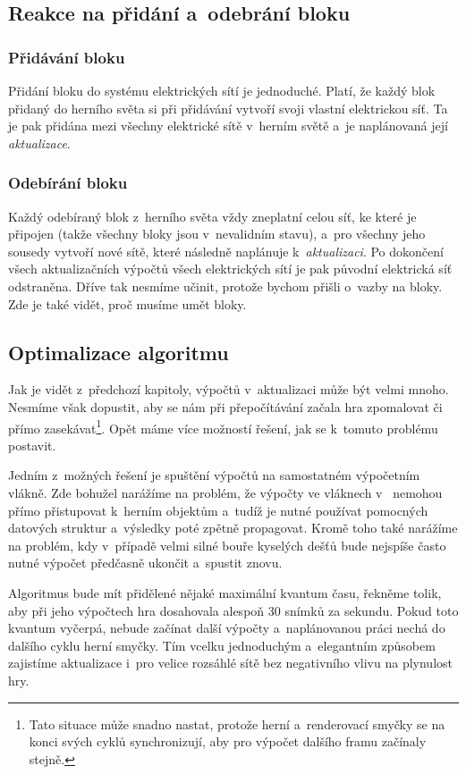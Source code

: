 \subsection{Reakce na přidání a~odebrání bloku}
\label{subsec:reac}
\subsubsection{Přidávání bloku}
Přidání bloku do systému elektrických sítí je jednoduché. Platí, že každý blok přidaný do herního světa si při přidávání vytvoří svoji vlastní elektrickou síť. Ta je pak přidána mezi všechny elektrické sítě v~herním světě a~je naplánovaná její \textit{aktualizace}. 

\subsubsection{Odebírání bloku}
Každý odebíraný blok z~herního světa vždy zneplatní celou síť, ke které je připojen (takže všechny bloky jsou v~nevalidním stavu), a~pro všechny jeho sousedy vytvoří nové sítě, které následně naplánuje k~\textit{aktualizaci}. Po dokončení všech aktualizačních výpočtů všech elektrických sítí je pak původní elektrická síť odstraněna. Dříve tak nesmíme učinit, protože bychom přišli o~vazby na bloky. Zde je také vidět, proč musíme umět  bloky.

\subsection{Optimalizace algoritmu}

Jak je vidět z~předchozí kapitoly, výpočtů v~aktualizaci může být velmi mnoho. Nesmíme však dopustit, aby se nám při přepočítávání začala hra zpomalovat či přímo zasekávat\footnote{Tato situace může snadno nastat, protože herní a~renderovací smyčky se na konci svých cyklů synchronizují, aby pro výpočet dalšího framu začínaly stejně.}. Opět máme více možností řešení, jak se k~tomuto problému postavit. 

Jedním z~možných řešení je spuštění výpočtů na samostatném výpočetním vlákně. Zde bohužel narážíme na problém, že výpočty ve vláknech v~\UEu{} nemohou přímo přistupovat k~herním objektům a~tudíž je nutné používat pomocných datových struktur a~výsledky poté zpětně propagovat. Kromě toho také narážíme na problém, kdy v~případě velmi silné bouře kyselých dešťů bude nejspíše často nutné výpočet předčasně ukončit a~spustit znovu.

Algoritmus bude mít přidělené nějaké maximální kvantum času, řekněme tolik, aby při jeho výpočtech hra dosahovala alespoň 30 snímků za sekundu. Pokud toto kvantum vyčerpá, nebude začínat další výpočty a~naplánovanou práci nechá do dalšího cyklu herní smyčky. Tím vcelku jednoduchým a~elegantním způsobem zajistíme aktualizace i~pro velice rozsáhlé sítě bez negativního vlivu na plynulost hry.








